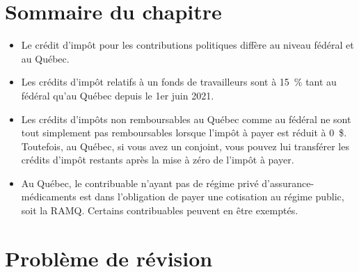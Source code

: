 \section{Sommaire du chapitre}
\begin{itemize}[label=]
	\item Le crédit d'impôt pour les contributions politiques diffère au niveau fédéral et au Québec.
	\item Les crédits d'impôt relatifs à un fonds de travailleurs sont à 15~\% tant au fédéral qu'au Québec depuis le 1er juin 2021.
	\item Les crédits d'impôts non remboursables au Québec comme au fédéral ne sont tout simplement pas remboursables lorsque l'impôt à payer est réduit à 0~\$. Toutefois, au Québec, si vous avez un conjoint, vous pouvez lui transférer les crédits d'impôt restants après la mise à zéro de l'impôt à payer.
	\item Au Québec, le contribuable n'ayant pas de régime privé d'assurance-médicaments est dans l'obligation de payer une cotisation au régime public, soit la RAMQ. Certains contribuables peuvent en être exemptés.
\end{itemize}



\section{Problème de révision}
